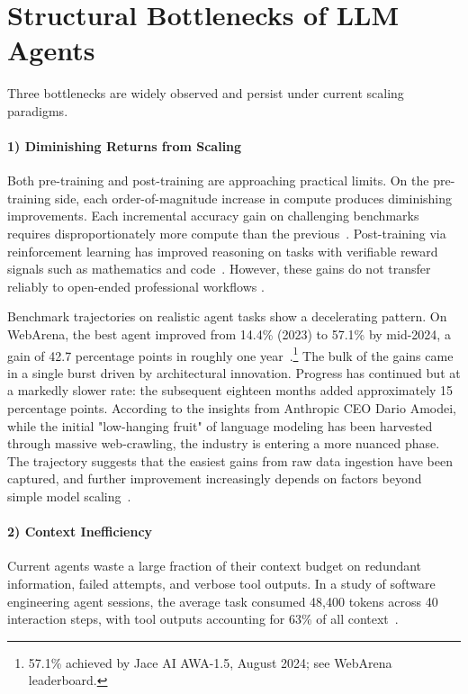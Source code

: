 \documentclass[sigconf,nonacm]{acmart}
\begin{document}
\section{Structural Bottlenecks of LLM Agents}
\label{sec:bottlenecks}

Three bottlenecks are widely observed and persist under current scaling paradigms.


\paragraph{\textbf{1) Diminishing Returns from Scaling}}
\label{sec:scaling}Both pre-training and post-training are approaching practical limits. On the pre-training side, each order-of-magnitude increase in compute produces diminishing improvements. Each incremental accuracy gain on challenging benchmarks requires disproportionately more compute than the previous~\cite{scalingwall2025}. Post-training via reinforcement learning has improved reasoning on tasks with verifiable reward signals such as mathematics and code~\cite{guo2025deepseek}. However, these gains do not transfer reliably to open-ended professional workflows \cite{huan2025does,yue2025does}.


Benchmark trajectories on realistic agent tasks show a decelerating pattern. On WebArena, the best agent improved from 14.4\% (2023) to 57.1\% by mid-2024, a gain of 42.7 percentage points in roughly one year~\cite{webarena2023}.\footnote{57.1\% achieved by Jace AI AWA-1.5, August 2024; see WebArena leaderboard.} The bulk of the gains came in a single burst driven by architectural innovation. Progress has continued but at a markedly slower rate: the subsequent eighteen months added approximately 15 percentage points. According to the insights from Anthropic CEO Dario Amodei, while the initial "low-hanging fruit" of language modeling has been harvested through massive web-crawling, the industry is entering a more nuanced phase. The trajectory suggests that the easiest gains from raw data ingestion have been captured, and further improvement increasingly depends on factors beyond simple model scaling~\cite{amodei2023dwarkesh}.


\paragraph{\textbf{2) Context Inefficiency}}
\label{sec:context}Current agents waste a large fraction of their context budget on redundant information, failed attempts, and verbose tool outputs. In a study of software engineering agent sessions, the average task consumed 48,400 tokens across 40 interaction steps, with tool outputs accounting for 63\% of all context~\cite{agentdiet2025}.
\end{document}
